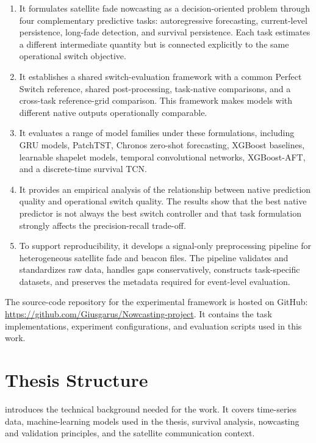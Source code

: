 \begin{enumerate}
  \item It formulates satellite fade nowcasting as a decision-oriented problem
  through four complementary predictive tasks: autoregressive forecasting,
  current-level persistence, long-fade detection, and survival persistence.
  Each task estimates a different intermediate quantity but is connected
  explicitly to the same operational switch objective.

  \item It establishes a shared switch-evaluation framework with a common
  Perfect Switch reference, shared post-processing, task-native comparisons,
  and a cross-task reference-grid comparison. This framework makes models with
  different native outputs operationally comparable.

  \item It evaluates a range of model families under these formulations,
  including GRU models, PatchTST, Chronos zero-shot forecasting, XGBoost
  baselines, learnable shapelet models, temporal convolutional networks,
  XGBoost-AFT, and a discrete-time survival TCN.

  \item It provides an empirical analysis of the relationship between native
  prediction quality and operational switch quality. The results show that the
  best native predictor is not always the best switch controller and that task
  formulation strongly affects the precision-recall trade-off.

  \item To support reproducibility, it develops a signal-only preprocessing
  pipeline for heterogeneous satellite fade and beacon files. The pipeline
  validates and standardizes raw data, handles gaps conservatively, constructs
  task-specific datasets, and preserves the metadata required for event-level
  evaluation.
\end{enumerate}

The source-code repository for the experimental framework is hosted on GitHub:
\url{https://github.com/Giusgarus/Nowcasting-project}.
It contains the task implementations, experiment configurations, and evaluation
scripts used in this work.

\section{Thesis Structure}
\label{sec:introduction-structure}

 introduces the technical background needed for the
work. It covers time-series data, machine-learning models used in the thesis,
survival analysis, nowcasting and validation principles, and the satellite
communication context.

